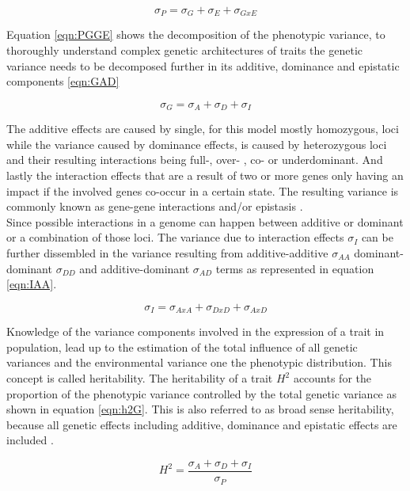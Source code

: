 \begin{equation}
 \sigma_{P} = \sigma_{G} + \sigma_{E} + \sigma_{GxE}
 \label{eqn:PGGE}
\end{equation}

Equation \ref{eqn:PGGE} shows the decomposition of the phenotypic variance, to thoroughly understand complex
genetic architectures of traits the genetic variance needs to be decomposed further in its additive, dominance
and epistatic components \ref{eqn:GAD}

\begin{equation}
  \sigma_{G} = \sigma_{A} + \sigma_{D} + \sigma_{I}
  \label{eqn:GAD}
\end{equation}

The additive effects are caused by single, for this model mostly homozygous, loci while the variance caused by
dominance effects, is caused by heterozygous loci and their resulting interactions being full-, over- , co- or
underdominant. And lastly the interaction effects that are a result of two or more genes only having an impact
if the involved genes co-occur in a certain state. The resulting variance is commonly known
as gene-gene interactions and/or epistasis \cite{falconer1996}. \\
Since possible interactions in a genome can happen between additive or dominant or a combination of those
loci. The variance due to interaction effects $\sigma_{I}$ can be further dissembled in the variance resulting
from additive-additive $\sigma_{AA}$ dominant-dominant $\sigma_{DD}$ and additive-dominant $\sigma_{AD}$ terms as
represented in equation \ref{eqn:IAA}.


\begin{equation}
  \sigma_{I} = \sigma_{AxA} + \sigma_{DxD} + \sigma_{AxD}
 \label{eqn:IAA}
\end{equation}

Knowledge of the variance components involved in the expression of a trait in population, lead up to the
estimation of the total influence of all genetic variances and the environmental variance one the phenotypic
distribution. This concept is called heritability. The heritability of a trait $H^2$ accounts for the
proportion of the phenotypic variance controlled by the total genetic variance as shown in equation
\ref{eqn:h2G}. This is also referred to as broad sense heritability, because all genetic effects including
additive, dominance and epistatic effects are included \cite{brooker1999genetics}.


\begin{equation}
 H^2 = \frac{\sigma_{A} + \sigma_{D} + \sigma_{I}}{\sigma_{P}}
 \label{eqn:h2G}
\end{equation}

